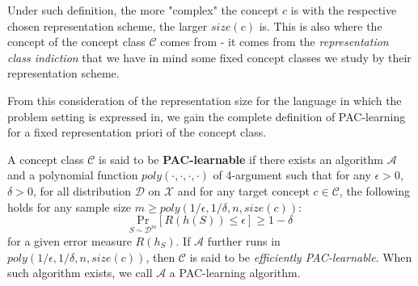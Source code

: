 Under such definition, the more "complex" the concept $c$ is with the respective chosen representation scheme, the larger $size(c)$ is. This is also where the concept of the concept class $\mathcal{C}$ comes from - it comes from the \textit{representation class indiction} that we have in mind some fixed concept classes we study by their representation scheme. 

From this consideration of the representation size for the language in which the problem setting is expressed in, we gain the complete definition of PAC-learning for a fixed representation priori of the concept class. 

\begin{definition}
    A concept class $\mathcal{C}$ is said to be \textbf{PAC-learnable} if there exists an algorithm $\mathcal{A}$ and a polynomial function $poly(\cdot,\cdot,\cdot,\cdot)$ of 4-argument such that for any $\epsilon>0$, $\delta>0$, for all distribution $\mathcal{D}$ on $\mathcal{X}$ and for any target concept $c\in\mathcal{C}$, the following holds for any sample size $m\geq poly(1/\epsilon,1/\delta,n,size(c))$: $$\underset{S\sim \mathcal{D}^{m}}{\mathrm{Pr}}\left[ R(h(S))\leq \epsilon \right]\geq 1-\delta$$
    for a given error measure $R(h_{S})$. If $\mathcal{A}$ further runs in $poly(1/\epsilon,1/\delta,n,size(c))$, then $\mathcal{C}$ is said to be \textit{efficiently PAC-learnable}. When such algorithm exists, we call $\mathcal{A}$ a PAC-learning algorithm. 
\end{definition}

